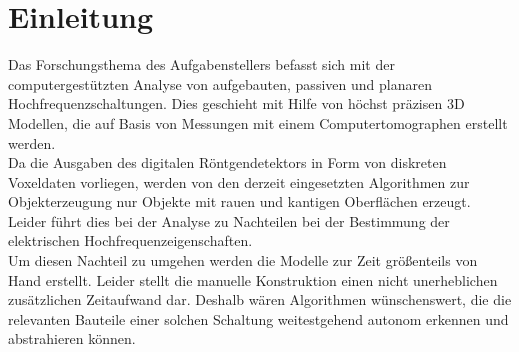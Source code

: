 
\chapter{Einleitung}
Das Forschungsthema des Aufgabenstellers befasst sich mit der computergestützten Analyse von aufgebauten, passiven und planaren Hochfrequenzschaltungen. Dies geschieht mit Hilfe von höchst präzisen 3D Modellen, die auf Basis von Messungen mit einem Computertomographen erstellt werden. \\
Da die Ausgaben des digitalen Röntgendetektors in Form von diskreten Voxeldaten vorliegen, werden von den derzeit eingesetzten Algorithmen zur Objekterzeugung nur Objekte mit rauen und kantigen Oberflächen erzeugt. Leider führt dies bei der Analyse zu Nachteilen bei der Bestimmung der elektrischen Hochfrequenzeigenschaften. \\
Um diesen Nachteil zu umgehen werden die Modelle zur Zeit größenteils von Hand erstellt. Leider stellt die manuelle Konstruktion einen nicht unerheblichen zusätzlichen Zeitaufwand dar. Deshalb wären Algorithmen wünschenswert, die die relevanten Bauteile einer solchen Schaltung weitestgehend autonom erkennen und abstrahieren können.
